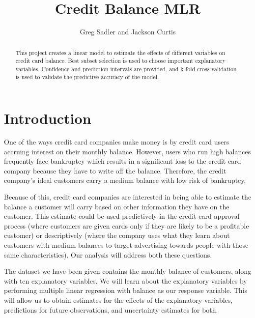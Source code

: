 \documentclass{article}
\begin{document}
        
\title{Credit Balance MLR}



\author{Greg Sadler and Jackson Curtis}
\maketitle 

\begin{abstract}
This project creates a linear model to estimate the effects of different variables on credit card balance. Best subset selection is used to choose important explanatory variables. Confidence and prediction intervals are provided, and k-fold cross-validation is used to validate the predictive accuracy of the model.
\end{abstract}

\section{Introduction}

One of the ways credit card companies make money is by credit card users accruing interest on their monthly balance. However, users who run high balances frequently face bankruptcy which results in a significant loss to the credit card company because they have to write off the balance. Therefore, the credit company's ideal customers carry a medium balance with low risk of bankruptcy. 

Because of this, credit card companies are interested in being able to estimate the balance a customer will carry based on other information they have on the customer. This estimate could be used predictively in the credit card approval process (where customers are given cards only if they are likely to be a profitable customer) or descriptively (where the company uses what they learn about customers with medium balances to target advertising towards people with those same characteristics). Our analysis will address both these questions.

The dataset we have been given contains the monthly balance of customers, along with ten explanatory variables. We will learn about the explanatory variables by performing multiple linear regression with balance as our response variable. This will allow us to obtain estimates for the effects of the explanatory variables, predictions for future observations, and uncertainty estimates for both.
\end{document}
